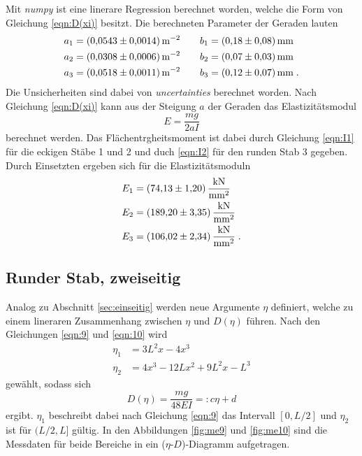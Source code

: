\noindent Mit \textit{numpy}
\cite{numpy} ist eine linerare Regression berechnet worden, welche die Form von Gleichung \eqref{eqn:D(xi)} besitzt. Die berechneten 
Parameter der Geraden lauten
\begin{align*}
    a_1&=\SI[per-mode=reciprocal]{0.0543 \pm 0.0014}{\per\square\metre} \qquad 
    b_1=\SI{0.18   \pm 0.08}{\milli\metre}      \\
    a_2&=\SI[per-mode=reciprocal]{0.0308 \pm 0.0006}{\per\square\metre} \qquad 
    b_2=\SI{0.07  \pm 0.03}  {\milli\metre}       \\
    a_3&=\SI[per-mode=reciprocal]{0.0518 \pm 0.0011}{\per\square\metre} \qquad 
    b_3=\SI{0.12   \pm 0.07}   {\milli\metre}         \;.
\end{align*}
Die Unsicherheiten sind dabei von \textit{uncertainties} \cite{uncertainties} berechnet worden.
Nach Gleichung \eqref{eqn:D(xi)} kann aus der Steigung $a$ der Geraden das Elastizitätsmodul 
\begin{equation}
    E=\frac{mg}{2aI}
    \label{eqn:E}
\end{equation}
berechnet werden. Das Flächentrgheitsmoment ist dabei durch Gleichung \eqref{eqn:I1} für die eckigen Stäbe 1 und 2 und duch \eqref{eqn:I2}
für den runden Stab 3 gegeben. Durch Einsetzten ergeben sich für die Elastizitätsmoduln
\begin{align*}
    E_1&=\SI{ 74.13 \pm 1.20}{\kilo\newton\per\square\milli\metre}\\ 
    E_2&=\SI{189.20 \pm 3.35}{\kilo\newton\per\square\milli\metre}\\ 
    E_3&=\SI{106.02 \pm 2.34}{\kilo\newton\per\square\milli\metre} \;.
\end{align*}

\subsection{Runder Stab, zweiseitig}   
\label{sec:zweiseitig}
Analog zu Abschnitt \ref{sec:einseitig} werden neue Argumente $\eta$ definiert, welche zu einem lineraren Zusammenhang zwischen 
$\eta$ und $D(\eta)$ führen. Nach den Gleichungen \eqref{eqn:9} und \eqref{eqn:10} wird 
\begin{align*}
    \eta_1&=3L^2x-4x^3 \\
    \eta_2&=4x^3-12Lx^2+9L^2x-L^3
\end{align*}
gewählt, sodass sich
\begin{equation}
    D(\eta)=\frac{mg}{48EI}=:c\eta+d
\end{equation}
ergibt. $\eta_1$ beschreibt dabei nach Gleichung \eqref{eqn:9} das Intervall $[0,L/2]$ und $\eta_2$ ist für $(L/2,L]$ gültig. In den Abbildungen
\ref{fig:me9} und \ref{fig:me10} sind die Messdaten für beide Bereiche in ein ($\eta$-$D$)-Diagramm aufgetragen. 

